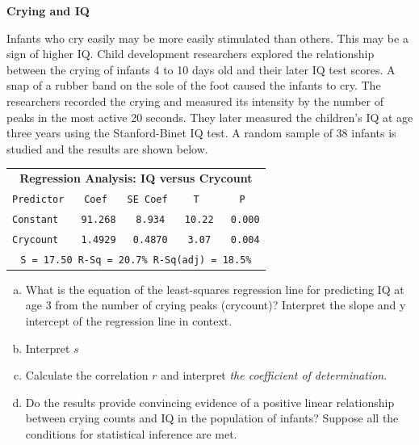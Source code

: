 \documentclass[a4paper, 12pt,twoside]{book}
\begin{document}
\colorbox{champagne}{\parbox{\textwidth}{
\textbf{Crying and IQ}\vspace{0.3cm}

Infants who cry easily may be more easily stimulated than others. This may be a sign of higher IQ. Child development researchers explored the relationship between the crying of infants 4 to 10 days old and their later IQ test scores. A snap of a rubber band on the sole of the foot caused the infants to cry. The researchers recorded the crying and measured its intensity by the number of peaks in the most active 20 seconds. They later measured the children’s IQ at age three years using the Stanford-Binet IQ test. A random sample of 38 infants is studied and the results are shown below.
   \begin{table}[H]
   \centering
   \begin{tabular}{|lcccc|}
   \hline
   \multicolumn{5}{|c|}{\textbf{Regression Analysis: IQ versus Crycount}}\\
   \texttt{Predictor}&\texttt{Coef}&\texttt{SE Coef}&\texttt{T}&\texttt{P}\\
   \texttt{Constant}& \texttt{ 91.268}&\texttt{ 8.934}&\texttt{ 10.22}&\texttt{ 0.000}\\
  \texttt{Crycount}&\texttt{ 1.4929}&\texttt{ 0.4870}&\texttt{ 3.07}&\texttt{ 0.004}\\
  \multicolumn{5}{|c|}{\texttt{S = 17.50  R-Sq = 20.7\%  R-Sq(adj) = 18.5\%}}\\ 
  \hline 
   \end{tabular}
   \end{table}
   
   
   \begin{enumerate}[(a)]
      \item What is the equation of the least-squares regression line for predicting IQ at age 3 from the number of crying peaks (crycount)? Interpret the slope and y intercept of the regression line in context.
      \item Interpret $s$
      \item Calculate the correlation $r$ and interpret \textit{the coefficient of determination}.
      \item Do the results provide convincing evidence of a positive linear relationship between crying counts and IQ in the population of infants? Suppose all the conditions for statistical inference are met.
   \end{enumerate}
}}
\end{document}
